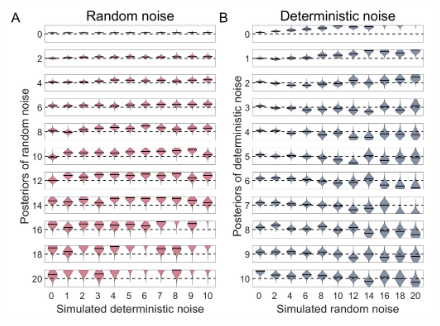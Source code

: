 \documentclass[12pt]{article}
\begin{document}
	\newpage
	\begin{figure}[H]
		\begin{center}
			\includegraphics[width=1\textwidth]{figures/RDBayes_parameterrecovery_gridsimu_all_R20.jpg}
			\caption{}
		\end{center}
	\end{figure}
	
	
	
\end{document}
